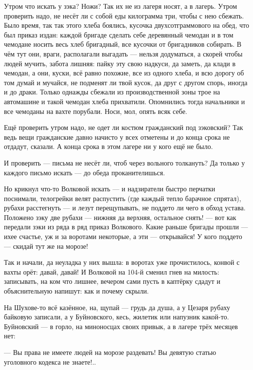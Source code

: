 Утром что искать у зэка? Ножи? Так их не из лагеря носят, а в лагерь. Утром проверить надо, не
несёт ли с собой еды килограмма три, чтобы с нею сбежать. Было время, так так этого хлеба
боялись, кусочка двухсотграммового на обед, что был приказ издан: каждой бригаде сделать
себе деревянный чемодан и в том чемодане носить весь хлеб бригадный, все кусочки от
бригадников собирать. В чём тут они, враги, располагали выгадать --- нельзя додуматься, а
скорей чтобы людей мучить, забота лишняя: пайку эту свою надкуси, да заметь, да клади в
чемодан, а они, куски, всё равно похожие, все из одного хлеба, и всю дорогу об том думай и
мучайся, не подменят ли твой кусок, да друг с другом спорь, иногда и до драки. Только однажды
сбежали из производственной зоны трое на автомашине и такой чемодан хлеба прихватили.
Опомнились тогда начальники и все чемоданы на вахте порубали. Носи, мол, опять всяк себе.

Ещё проверить утром надо, не одет ли костюм гражданский под зэковский? Так ведь вещи
гражданские давно начисто у всех отметены и до конца срока не отдадут, сказали. А конца срока
в этом лагере ни у кого ещё не было.

И проверить --- письма не несёт ли, чтоб через вольного толкануть? Да только у каждого письмо
искать --- до обеда проканителишься.

Но крикнул что-то Волковой искать --- и надзиратели быстро перчатки поснимали, телогрейки
велят распустить (где каждый тепло барачное спрятал), рубахи расстегнуть --- и лезут
перещупывать, не поддето ли чего в обход устава. Положено зэку две рубахи --- нижняя да
верхняя, остальное снять! --- вот как передали зэки из ряда в ряд приказ Волкового. Какие
раньше бригады прошли --- ихее счастье, уж и за воротами некоторые, а эти --- открывайся! У кого
поддето --- скидай тут же на морозе!

Так и начали, да неуладка у них вышла: в воротах уже прочистилось, конвой с вахты орёт: давай,
давай! И Волковой на 104-й сменил гнев на милость: записывать, на ком что лишнее, вечером сами
пусть в каптёрку сдадут и объяснительную напишут: как и почему скрыли.

На Шухове-то всё казённое, на, щупай --- грудь да душа, а у Цезаря рубаху байковую записали, а у
Буйновского, кесь, жилетик или напузник какой-то. Буйновский --- в горло, на миноносцах своих
привык, а в лагере трёх месяцев нет:

--- Вы права не имеете людей на морозе раздевать! Вы девятую статью уголовного кодекса не
знаете!..

